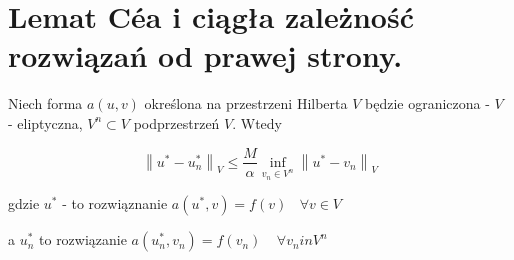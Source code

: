 \section{Lemat Céa i ciągła zależność rozwiązań od prawej strony.}

Niech forma $a(u,v)$ określona na przestrzeni Hilberta $V$ będzie ograniczona - $V$ - eliptyczna, $V^n \subset V$ podprzestrzeń $V$. Wtedy

\[ \left \| u^* - u^*_n \right \|_V \leqslant \frac{M}{\alpha} \inf_{v_n \in V^n} \left \| u^* - v_n \right \|_V \]

gdzie $u^*$ - to rozwiąznanie $a(u^*,v) = f(v)\ \ \ \ \forall v \in V$

a $u_n^*$ to rozwiązanie $a(u^*_n,v_n) = f(v_n)\ \ \ \ \ \forall v_n in V^n$

